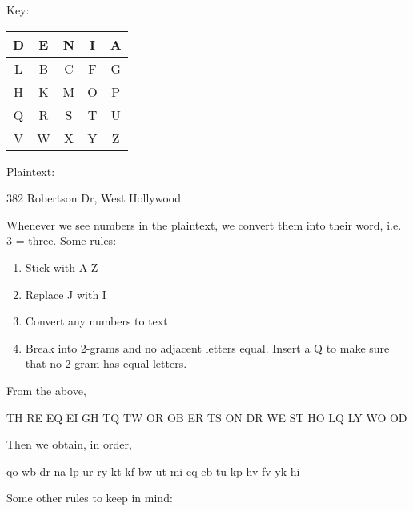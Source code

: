 \documentclass[11pt]{article}
\theoremstyle{definition}\newtheorem{definition}{Definition}
\theoremstyle{definition}\newtheorem{example}{Example}
\theoremstyle{definition}\newtheorem{samplecode}{Sample Code}
\begin{document}
Key:
\begin{center}
    \begin{tabular}{|c|c|c|c|c|} \hline
        D & E & N & I & A \\ \hline
        L & B & C & F & G \\ \hline
        H & K & M & O & P \\ \hline
        Q & R & S & T & U \\ \hline
        V & W & X & Y & Z \\ \hline
    \end{tabular}
\end{center}
Plaintext:
\begin{center}
    \textsf{382 Robertson Dr, West Hollywood}
\end{center}
Whenever we see numbers in the plaintext, we convert them into their word, i.e. 3 = three. Some rules:
\begin{enumerate}
    \item Stick with A-Z
    \item Replace J with I
    \item Convert any numbers to text
    \item Break into 2-grams and no adjacent letters equal. Insert a Q to make sure that no 2-gram has equal letters.
\end{enumerate}
From the above,
\begin{center}
    \textsf{TH RE EQ EI GH TQ TW OR OB ER TS ON DR WE ST HO LQ LY WO OD}
\end{center}
Then we obtain, in order,
\begin{center}
    \textsf{qo wb dr na lp ur ry kt kf bw ut mi eq eb tu kp hv fv yk hi}
\end{center}
Some other rules to keep in mind:
\end{document}
